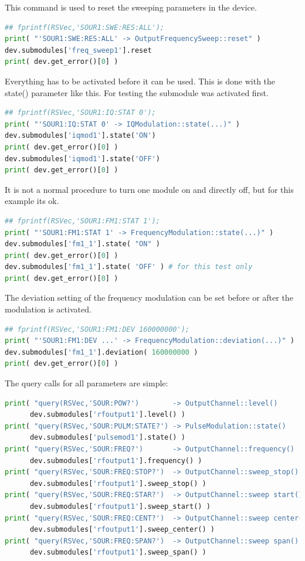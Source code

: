 \documentclass[11pt]{article} %
\begin{document}
This command is used to reset the sweeping parameters in the device.
\begin{lstlisting}[frame=single, language=Python]
## fprintf(RSVec,'SOUR1:SWE:RES:ALL');
print( "'SOUR1:SWE:RES:ALL' -> OutputFrequencySweep::reset" )
dev.submodules['freq_sweep1'].reset
print( dev.get_error()[0] )
\end{lstlisting}

Everything has to be activated before it can be used. This is done with the state() parameter like this. For testing the submodule was activated first.
\begin{lstlisting}[frame=single, language=Python]
## fprintf(RSVec,'SOUR1:IQ:STAT 0');
print( "'SOUR1:IQ:STAT 0' -> IQModulation::state(...)" )
dev.submodules['iqmod1'].state('ON')
print( dev.get_error()[0] )
dev.submodules['iqmod1'].state('OFF')
print( dev.get_error()[0] )
\end{lstlisting}

It is not a normal procedure to turn one module on and directly off, but for this example its ok.
\begin{lstlisting}[frame=single, language=Python]
## fprintf(RSVec,'SOUR1:FM1:STAT 1');
print( "'SOUR1:FM1:STAT 1' -> FrequencyModulation::state(...)" )
dev.submodules['fm1_1'].state( "ON" )
print( dev.get_error()[0] )
dev.submodules['fm1_1'].state( 'OFF' ) # for this test only
print( dev.get_error()[0] )
\end{lstlisting}

The deviation setting of the frequency modulation can be set before or after the modulation is activated.
\begin{lstlisting}[frame=single, language=Python]
## fprintf(RSVec,'SOUR1:FM1:DEV 160000000');
print( "'SOUR1:FM1:DEV ...' -> FrequencyModulation::deviation(...)" )
dev.submodules['fm1_1'].deviation( 160000000 )
print( dev.get_error()[0] )
\end{lstlisting}

The query calls for all parameters are simple:
\begin{lstlisting}[frame=single, language=Python]
print( "query(RSVec,'SOUR:POW?')        -> OutputChannel::level()       ",
      dev.submodules['rfoutput1'].level() )
print( "query(RSVec,'SOUR:PULM:STATE?') -> PulseModulation::state()     ",
      dev.submodules['pulsemod1'].state() )
print( "query(RSVec,'SOUR:FREQ?')       -> OutputChannel::frequency()   ",
      dev.submodules['rfoutput1'].frequency() )
print( "query(RSVec,'SOUR:FREQ:STOP?')  -> OutputChannel::sweep_stop()  ",
      dev.submodules['rfoutput1'].sweep_stop() )
print( "query(RSVec,'SOUR:FREQ:STAR?')  -> OutputChannel::sweep start() ",
      dev.submodules['rfoutput1'].sweep_start() )
print( "query(RSVec,'SOUR:FREQ:CENT?')  -> OutputChannel::sweep center()",
      dev.submodules['rfoutput1'].sweep_center() )
print( "query(RSVec,'SOUR:FREQ:SPAN?')  -> OutputChannel::sweep span()  ",
      dev.submodules['rfoutput1'].sweep_span() )
\end{lstlisting}
\end{document}

